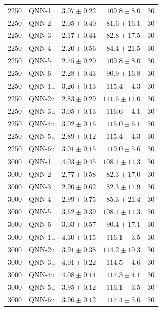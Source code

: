 \begin{table}[htbp]
\begin{tabular}{rlrrr}
\midrule
2250 & QNN-1 & $3.07 \pm 0.22$ & $109.8 \pm 8.0$ & 30 \\
2250 & QNN-2 & $2.05 \pm 0.40$ & $81.6 \pm 16.1$ & 30 \\
2250 & QNN-3 & $2.17 \pm 0.44$ & $82.8 \pm 17.5$ & 30 \\
2250 & QNN-4 & $2.20 \pm 0.56$ & $84.4 \pm 21.5$ & 30 \\
2250 & QNN-5 & $2.75 \pm 0.20$ & $109.8 \pm 8.0$ & 30 \\
2250 & QNN-6 & $2.28 \pm 0.43$ & $90.9 \pm 16.8$ & 30 \\
2250 & QNN-1u & $3.26 \pm 0.13$ & $115.4 \pm 4.3$ & 30 \\
2250 & QNN-2u & $2.83 \pm 0.29$ & $111.6 \pm 11.0$ & 30 \\
2250 & QNN-3u & $3.05 \pm 0.13$ & $116.6 \pm 4.1$ & 30 \\
2250 & QNN-4u & $3.02 \pm 0.16$ & $116.0 \pm 6.1$ & 30 \\
2250 & QNN-5u & $2.89 \pm 0.12$ & $115.4 \pm 4.3$ & 30 \\
2250 & QNN-6u & $3.01 \pm 0.15$ & $119.0 \pm 5.6$ & 30 \\
\midrule
3000 & QNN-1 & $4.03 \pm 0.45$ & $108.1 \pm 11.3$ & 30 \\
3000 & QNN-2 & $2.77 \pm 0.58$ & $82.3 \pm 17.0$ & 30 \\
3000 & QNN-3 & $2.90 \pm 0.62$ & $82.3 \pm 17.9$ & 30 \\
3000 & QNN-4 & $2.99 \pm 0.75$ & $85.3 \pm 21.4$ & 30 \\
3000 & QNN-5 & $3.62 \pm 0.39$ & $108.1 \pm 11.3$ & 30 \\
3000 & QNN-6 & $3.03 \pm 0.57$ & $90.4 \pm 17.1$ & 30 \\
3000 & QNN-1u & $4.30 \pm 0.15$ & $116.1 \pm 3.5$ & 30 \\
3000 & QNN-2u & $3.91 \pm 0.38$ & $114.2 \pm 10.3$ & 30 \\
3000 & QNN-3u & $4.01 \pm 0.22$ & $114.5 \pm 4.6$ & 30 \\
3000 & QNN-4u & $4.08 \pm 0.14$ & $117.3 \pm 4.1$ & 30 \\
3000 & QNN-5u & $3.95 \pm 0.12$ & $116.1 \pm 3.5$ & 30 \\
3000 & QNN-6u & $3.96 \pm 0.12$ & $117.4 \pm 3.6$ & 30 \\
\bottomrule
\end{tabular}
\par{}
\end{table}

